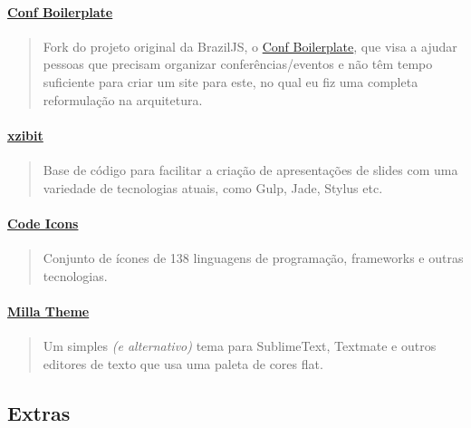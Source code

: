 \documentclass[]{article}
\let\oldparagraph\paragraph
\renewcommand{\paragraph}[1]{\oldparagraph{#1}\mbox{}}
\begin{document}
\paragraph{\texorpdfstring{\href{https://github.com/mabrasil/conf-boilerplate}{Conf
Boilerplate}}{Conf Boilerplate}}\label{conf-boilerplate}

\begin{quote}
Fork do projeto original da BrazilJS, o
\href{https://github.com/braziljs/conf-boilerplate}{Conf Boilerplate},
que visa a ajudar pessoas que precisam organizar conferências/eventos e
não têm tempo suficiente para criar um site para este, no qual eu fiz
uma completa reformulação na arquitetura.
\end{quote}

\paragraph{\texorpdfstring{\href{https://github.com/mabrasil/xzibit}{xzibit}}{xzibit}}\label{xzibit}

\begin{quote}
Base de código para facilitar a criação de apresentações de slides com
uma variedade de tecnologias atuais, como Gulp, Jade, Stylus etc.
\end{quote}

\paragraph{\texorpdfstring{\href{https://github.com/mabrasil/codeicons}{Code
Icons}}{Code Icons}}\label{code-icons}

\begin{quote}
Conjunto de ícones de 138 linguagens de programação, frameworks e outras
tecnologias.
\end{quote}

\paragraph{\texorpdfstring{\href{https://github.com/mabrasil/milla-theme}{Milla
Theme}}{Milla Theme}}\label{milla-theme}

\begin{quote}
Um simples \emph{(e alternativo)} tema para SublimeText, Textmate e
outros editores de texto que usa uma paleta de cores flat.
\end{quote}

\subsection{Extras}\label{extras}
\end{document}
